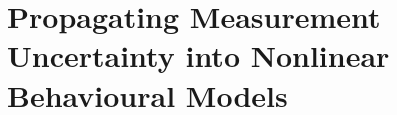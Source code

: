 \documentclass[../thesis.tex]{subfiles}
\begin{document}
\chapter{Propagating Measurement Uncertainty into Nonlinear Behavioural Models}
\end{document}
